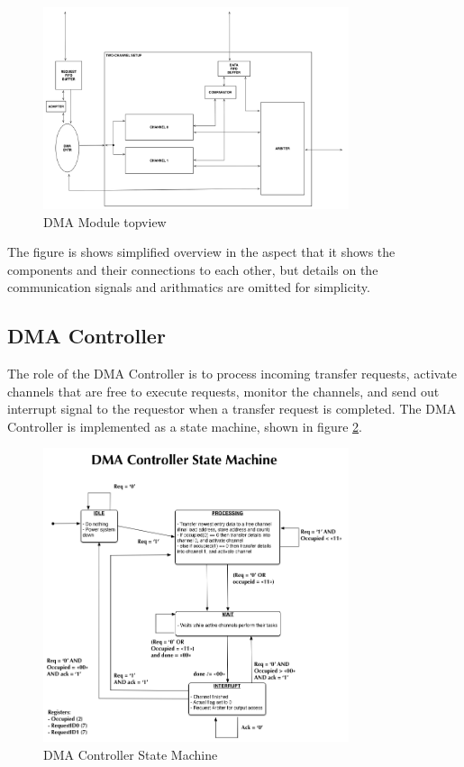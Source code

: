 \begin{figure}[h!]
    \centering
    \includegraphics[width=0.8\textwidth]{Figures/DMA/TopViewFinalSimple}
    \caption{DMA Module topview}
    \label{fig:DMATopView}
\end{figure}

The figure is shows simplified overview in the aspect that it shows the components and their connections to each other, but details on the communication signals and arithmatics are omitted for simplicity. 

\subsection{DMA Controller}
The role of the DMA Controller is to process incoming transfer requests, activate channels that are free to execute requests, monitor the channels, and send out interrupt signal to the requestor when a transfer request is completed. 
The DMA Controller is implemented as a state machine, shown in figure \ref{fig:DMAControllerStateMachine}.

\begin{figure}[h!]
    \centering
    \includegraphics[width=0.8\textwidth]{Figures/DMA/StateMachineFinal}
    \caption{DMA Controller State Machine}
    \label{fig:DMAControllerStateMachine}
\end{figure}

